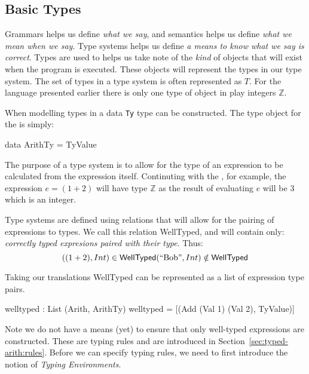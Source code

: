 \subsection{Basic Types}
\label{sec:typed-arith:types}

Grammars helps us define \emph{what we say}, and semantics helps us define \emph{what we mean when we say}.
Type systems helps us define \emph{a means to know what we say is correct}.
Types are used to helps us take note of the \emph{kind} of objects that will exist when the program is executed.
These objects will represent the types in our type system.
The set of types in a type system is often represented as $T$.
For the language presented earlier there is only one type of object in play integers $\mathbb{Z}$.

\begin{bnf}
\end{bnf}

\noindent
When modelling types in \idris{} a data \texttt{Ty} type can be constructed.
The type object for the \allang{} is simply:

\begin{code}
data ArithTy = TyValue
\end{code}

\noindent
The purpose of a type system is to allow for the type of an expression to be calculated from the expression itself.
Continuting with the \allang{}, for example, the expression $e=(1 + 2)$ will have type $\mathbb{Z}$ as the result of evaluating $e$ will be $3$ which is an integer.

Type systems are defined using relations that will allow for the pairing of expressions to types.
We call this relation \textsf{WellTyped}, and will contain only: \emph{correctly typed expresions paired with their type}.
Thus:
\[
((1+2), Int)\in\mathsf{WellTyped}\\
(\text{``Bob''},Int)\notin\mathsf{WellTyped}
\]

\noindent
Taking our \idris{} translations \textsf{WellTyped} can be represented as a list of expression type pairs.

\begin{code}
welltyped : List (Arith, ArithTy)
welltyped = [(Add (Val 1) (Val 2), TyValue)]
\end{code}

\noindent
Note we do not have a means (yet) to ensure that only well-typed expressions are constructed.
These are typing rules and are introduced in Section~\ref{sec:typed-arith:rules}.
Before we can specify typing rules, we need to first introduce the notion of \emph{Typing Environments}.

